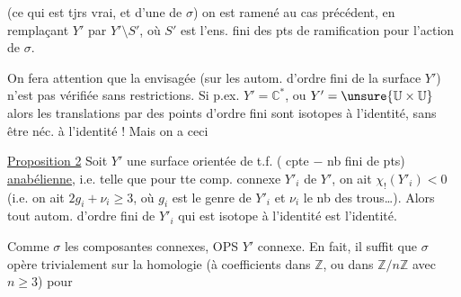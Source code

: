 (ce qui est  tjrs vrai, et   d'une  de $\sigma$) on est ramené au cas précédent, en  remplaçant $Y'$ par $Y'\setminus S'$, où $S'$ est l'ens. fini des pts de ramification pour l'action de $\sigma$. 

On fera attention que la   envisagée  (sur les autom. d'ordre fini de la surface $Y'$) n'est pas vérifiée sans restrictions. Si p.ex. $Y'=\mathbb{C}^*$, ou $Y'=\unsure{\mathbb{U}\times\mathbb{U}}$ alors les translations par des points d'ordre fini sont isotopes à l'identité, sans être néc.  à l'identité ! Mais on a ceci

\uline{Proposition 2} Soit $Y'$ une surface orientée de t.f. ( cpte $-$ nb fini de pts) \uline{anabélienne}, i.e. telle que pour tte comp. connexe $Y'_i$ de $Y'$, on ait $\chi_!(Y'_i)<0$ (i.e. on ait $2g_i+\nu_i\geq 3$, où $g_i$ est le genre de $Y'_i$ et $\nu_i$ le nb des trous\ldots). Alors tout autom. \inserted{$\sigma$} d'ordre fini de $Y'_i$ qui est isotope à l'identité est l'identité.

Comme $\sigma$  les composantes connexes, OPS $Y'$ connexe. En fait, il suffit que $\sigma$ opère trivialement sur la homologie  (à coefficients dans $\mathbb{Z}$, ou dans  $\mathbb{Z}/n\mathbb{Z}$ avec $n\geq3$) pour
